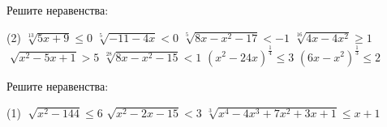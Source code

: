 \begin{class}[number=8]
	\begin{listofex}
		\item Решите неравенства: %
		\begin{tasks}(2)
			\task \( \sqrt[13]{5x+9} \le 0 \)
			\task \( \sqrt[5]{-11-4x} < 0 \)
			\task \( \sqrt[5]{8x-x^2-17} < -1 \)
			\task \( \sqrt[16]{4x-4x^2} \ge 1 \)
			\task \( \sqrt[]{x^2-5x+1} > 5 \)
			\task \( \sqrt[28]{8x-x^2-15} < 1 \)
			\task \( (x^2-24x)^{\tfrac{1}{4}} \le 3 \)
			\task \( (6x-x^2)^{\tfrac{1}{3}} \le 2 \)
		\end{tasks}
		\item Решите неравенства: %
		\begin{tasks}(1)
			\task \( \sqrt[]{x^2-144} \le 6 \)
			\task \( \sqrt{x^2-2x-15} < 3 \)
			\task \( \sqrt[3]{x^4-4x^3+7x^2+3x+1} \le x+1 \)
			
		\end{tasks}
	\end{listofex}
\end{class}

